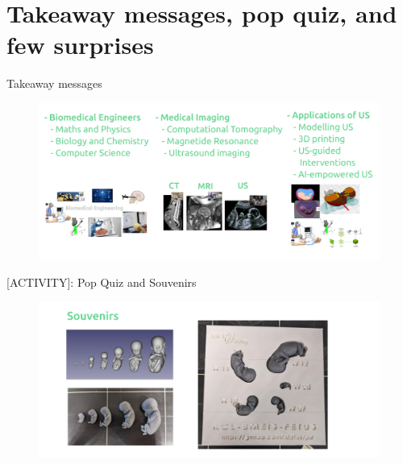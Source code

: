 \section{Takeaway messages, pop quiz, and few surprises}



{
\begin{frame}{Takeaway messages}
  \begin{figure}
  \centering
  \includegraphics[width=1.0\textwidth]{./../figures/takeaways/versions/drawing-v05}
  \end{figure}

\end{frame}
}

{
\begin{frame}{[\faUsers \faGift ACTIVITY]: Pop Quiz and Souvenirs}
  \begin{figure}
  \centering
  \includegraphics[width=1.0\textwidth]{./../figures/popquiz-souvenirs/versions/drawing-v03}
  \end{figure}

\end{frame}
}



